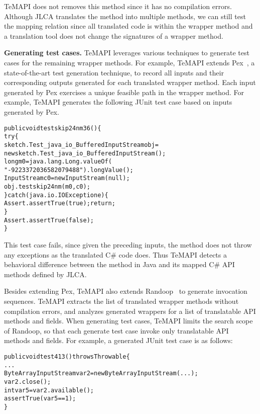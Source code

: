 TeMAPI does not removes this method since it has no compilation errors. Although JLCA translates the  method into multiple methods, we can still test the mapping relation since all translated code is within the wrapper method and a translation tool does not change the signatures of a wrapper method.  

\textbf{Generating test cases.} TeMAPI leverages various techniques to generate test cases for the remaining wrapper methods. For example, TeMAPI extends Pex~\cite{tillmann2008pex}, a state-of-the-art test generation technique, to record all inputs and their corresponding outputs generated for each translated wrapper method. Each input generated by Pex exercises a unique feasible path in the wrapper method. For example, TeMAPI generates the following JUnit test case based on inputs generated by Pex.

\begin{CodeOut}\vspace*{-1ex}
\begin{alltt}
public void testskip24nm36()\{
  try\{
     sketch.Test_java_io_BufferedInputStream obj = 
        new sketch.Test_java_io_BufferedInputStream();
     long m0 = java.lang.Long.valueOf(
                  "-9223372036582079488").longValue();
     InputStream c0 = new InputStream(null);
     obj.testskip24nm(m0,c0);
  \}catch(java.io.IOException e)\{
     Assert.assertTrue(true);return;
  \}
  Assert.assertTrue(false);
\}
\end{alltt}
\end{CodeOut}\vspace*{-2ex}

This test case fails, since given the preceding inputs, the  method does not throw any exceptions as the translated C\# code does. Thus TeMAPI detects a behavioral difference between the  method in Java and its mapped C\# API methods defined by JLCA.

Besides extending Pex, TeMAPI also extends Randoop~\cite{pacheco2007feedback} to generate invocation sequences. TeMAPI extracts the list of translated wrapper methods without compilation errors, and analyzes generated wrappers for a list of translatable API methods and fields. When generating test cases, TeMAPI limits the search scope of Randoop, so that each generate test case invoke only translatable API methods and fields. For example, a generated JUnit test case is as follows:

\begin{CodeOut}\vspace*{-1ex}
\begin{alltt}
public void test413() throws Throwable\{
  ...
  ByteArrayInputStream var2=new ByteArrayInputStream(...);
  var2.close();
  int var5=var2.available();
  assertTrue(var5 == 1);
\}
\end{alltt}
\end{CodeOut}\vspace*{-2ex}



